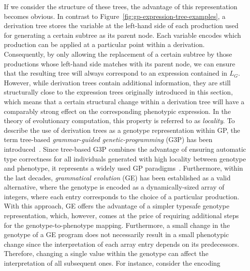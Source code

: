If we consider the structure of these trees, the advantage of this representation becomes obvious.
In contrast to Figure~\ref{fig:gp-expression-tree-examples}, a derivation tree stores the variable at the left-hand side of each production used for generating a certain subtree as its parent node.
Each variable encodes which production can be applied at a particular point within a derivation.
Consequently, by only allowing the replacement of a certain subtree by those productions whose left-hand side matches with its parent node, we can ensure that the resulting tree will always correspond to an expression contained in $L_G$. 
However, while derivation trees contain additional information, they are still structurally close to the expression trees originally introduced in this section, which means that a certain structural change within a derivation tree will have a comparably strong effect on the corresponding phenotypic expression.
In the theory of evolutionary computation, this property is referred to as \emph{locality}.
To describe the use of derivation trees as a genotype representation within GP, the term tree-based \emph{grammar-guided genetic-programming} (G3P) has been introduced~\cite{mckay2010grammar,whigham1995grammatically}.
Since tree-based G3P combines the advantage of ensuring automatic type correctness for all individuals generated with high locality between genotype and phenotype, it represents a widely used GP paradigms~\cite{mckay2010grammar}.
Furthermore, within the last decades, \emph{grammatical evolution} (GE) has been established as a valid alternative, where the genotype is encoded as a dynamically-sized array of integers, where each entry corresponds to the choice of a particular production.
With this approach, GE offers the advantage of a simpler typesafe genotype representation, which, however, comes at the price of requiring additional steps for the genotype-to-phenotype mapping.
Furthermore, a small change in the genotype of a GE program does not necessarily result in a small phenotypic change since the interpretation of each array entry depends on its predecessors.
Therefore, changing a single value within the genotype can affect the interpretation of all subsequent ones.
For instance, consider the encoding
